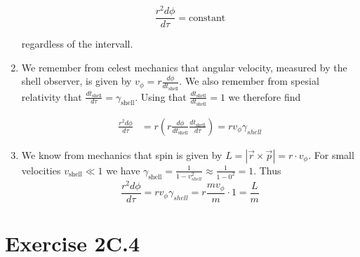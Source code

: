 \documentclass[a4paper,10pt,english]{article}
\begin{document}
\begin{enumerate}
\[\frac{r^{2}d\phi}{d\tau}=\text{constant}\] 

regardless of the intervall.

\item We remember from celest mechanics that angular velocity, measured by the shell observer, is given by $v_{\phi}=r\frac{d\phi}{dt_{\text{shell}}}$. We also remember from spesial relativity that $\frac{dt_{\text{shell}}}{d\tau}=\gamma_{\text{shell}}$. Using that $\frac{dt_{\text{shell}}}{dt_{\text{shell}}}=1$ we therefore find

\begin{align*}
\frac{r^{2}d\phi}{d\tau}&=r\left(r\frac{d\phi}{dt_{\text{shell}}}\frac{dt_{\text{shell}}}{d\tau}\right)=rv_{\phi}\gamma_{shell}
\end{align*}

\item We know from mechanics that spin is given by $L=|\vec{r}\times\vec{p}|=r\cdot v_{\phi}$. For small velocities $v_{\text{shell}}\ll1$ we have $\gamma_{\text{shell}}=\frac{1}{1-v_{shell}^{2}}\approx\frac{1}{1-0^{2}}=1$. Thus \[\frac{r^{2}d\phi}{d\tau}=rv_{\phi}\gamma_{shell}=r\frac{mv_{\phi}}{m}\cdot1=\frac{L}{m}\]
 
\end{enumerate}








\section*{Exercise 2C.4}
\end{document}
